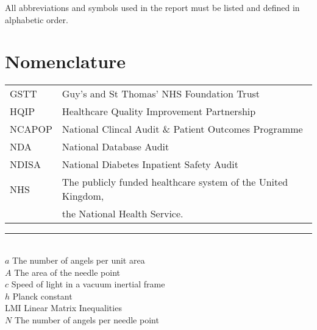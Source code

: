  All abbreviations and symbols used in the report must be listed and defined in alphabetic order.

\section*{Nomenclature}

\begin{flushleft}
\begin{minipage}{1\textwidth}
    	\centering
        \def\arraystretch{1.25}%
    	\begin{tabular}{ll}
			GSTT  & Guy's and St Thomas' NHS Foundation Trust \\
			HQIP & Healthcare Quality Improvement Partnership \\
			NCAPOP & National Clincal Audit \& Patient Outcomes Programme \\
			NDA   & National Database Audit  \\
    		NDISA & National Diabetes Inpatient Safety Audit \\  
    		NHS & The publicly funded healthcare system of the United Kingdom, \\ 
            & the National Health Service. \\
      
                
    	\end{tabular}
\end{minipage}

\end{flushleft}

\noindent\rule{8cm}{0.4pt} \\ %
$a$ \qquad The number of angels per unit area\\
$A$ \qquad The area of the needle point\\
$c$ \qquad Speed of light in a vacuum inertial frame\\
$h$ \qquad Planck constant\\
LMI	\qquad Linear Matrix Inequalities\\
$N$ \qquad The number of angels per needle point